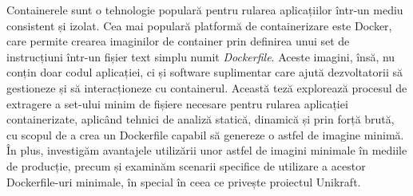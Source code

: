 
Containerele sunt o tehnologie populară pentru rularea aplicațiilor într-un mediu consistent și izolat.
Cea mai populară platformă de containerizare este Docker, care permite crearea imaginilor de container prin definirea unui set de instrucțiuni într-un fișier text simplu numit \textit{Dockerfile}.
Aceste imagini, însă, nu conțin doar codul aplicației, ci și software suplimentar care ajută dezvoltatorii să gestioneze și să interacționeze cu containerul.
Această teză explorează procesul de extragere a set-ului minim de fișiere necesare pentru rularea aplicației containerizate, aplicând tehnici de analiză statică, dinamică și prin forță brută, cu scopul de a crea un Dockerfile capabil să genereze o astfel de imagine minimă.
În plus, investigăm avantajele utilizării unor astfel de imagini minimale în mediile de producție, precum și examinăm scenarii specifice de utilizare a acestor Dockerfile-uri minimale, în special în ceea ce privește proiectul Unikraft.